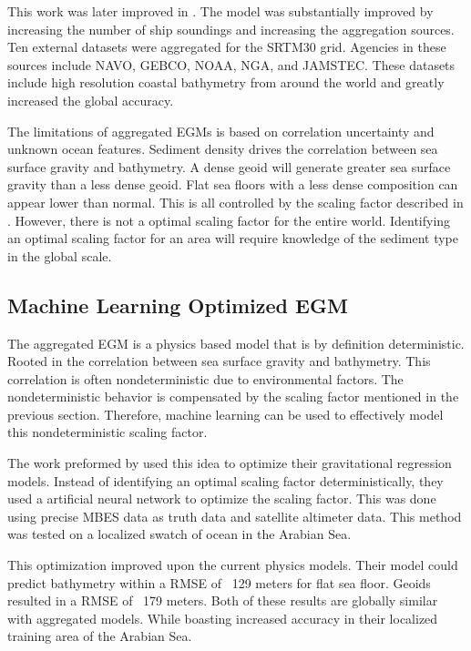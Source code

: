 \par 
This work was later improved in \cite{becker2009global}.
The model was substantially improved by increasing the number of ship soundings and increasing the aggregation sources.
Ten external datasets were aggregated for the SRTM30 grid.
Agencies in these sources include \ac{NAVO}, \ac{GEBCO}, \ac{NOAA}, \ac{NGA}, and \ac{JAMSTEC}.
These datasets include high resolution coastal bathymetry from around the world and greatly increased the global accuracy.

\par
The limitations of aggregated \ac{EGM}s is based on correlation uncertainty and unknown ocean features.
Sediment density drives the correlation between sea surface gravity and bathymetry.
A dense geoid will generate greater sea surface gravity than a less dense geoid.
Flat sea floors with a less dense composition can appear lower than normal.
This is all controlled by the scaling factor described in \cite{smith1994bathymetric}. 
However, there is not a optimal scaling factor for the entire world.
Identifying an optimal scaling factor for an area will require knowledge of the sediment type in the global scale.


\subsection{Machine Learning Optimized \ac{EGM}}
The aggregated \ac{EGM} is a physics based model that is by definition deterministic.
Rooted in the correlation between sea surface gravity and bathymetry.
This correlation is often nondeterministic due to environmental factors.
The nondeterministic behavior is compensated by the scaling factor mentioned in the previous section.
Therefore, machine learning can be used to effectively model this nondeterministic scaling factor.

\par
The work preformed by \cite{jena2012prediction} used this idea to optimize their gravitational regression models.
Instead of identifying an optimal scaling factor deterministically, they used a artificial neural network to optimize the scaling factor.
This was done using precise \ac{MBES} data as truth data and satellite altimeter data.
This method was tested on a localized swatch of ocean in the Arabian Sea.

\par
This optimization improved upon the current physics models.
Their model could predict bathymetry within a \ac{RMSE} of ~129 meters for flat sea floor.
Geoids resulted in a \ac{RMSE} of ~179 meters.
Both of these results are globally similar with aggregated models.
While boasting increased accuracy in their localized training area of the Arabian Sea.

